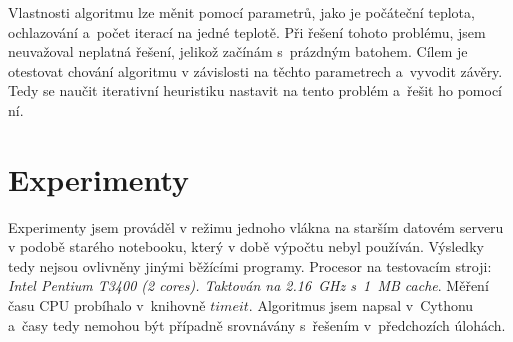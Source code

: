 \documentclass[11pt]{article}
\begin{document}
Vlastnosti algoritmu lze měnit pomocí parametrů, jako je počáteční teplota, ochlazování a~počet iterací na jedné teplotě. Při řešení tohoto problému, jsem neuvažoval neplatná řešení, jelikož začínám s~prázdným batohem. Cílem je otestovat chování algoritmu v závislosti na těchto parametrech a~vyvodit závěry. Tedy se naučit iterativní heuristiku nastavit na tento problém a~řešit ho pomocí ní. 


\section{Experimenty}\label{kap:experiments}


Experimenty jsem prováděl v režimu jednoho vlákna na starším datovém serveru v podobě starého notebooku, který v době výpočtu nebyl používán. Výsledky tedy nejsou ovlivněny jinými běžícími programy. Procesor na testovacím stroji: \textit{Intel Pentium T3400 (2 cores). Taktován na 2.16~GHz s~1~MB cache}.
Měření času CPU probíhalo v~knihovně $timeit$. Algoritmus jsem napsal v~Cythonu a~časy tedy nemohou být případně srovnávány s~řešením v~předchozích úlohách.

 
\end{document}
